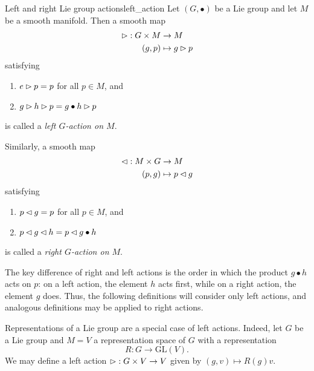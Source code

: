 \begin{definition}{Left and right Lie group actions}{left_action}
    Let \((G, \bullet)\) be a Lie group and let \(M\) be a smooth manifold. Then a smooth map
    \begin{align*}
        \mathbin{\vartriangleright} : G \times M &\to M\\
                     (g,p) &\mapsto g \mathbin{\vartriangleright} p
    \end{align*}
    satisfying
    \begin{enumerate}[label=(\alph*)]
        \item \(e \mathbin{\vartriangleright} p = p\) for all \(p \in M\), and
        \item \(g \mathbin{\vartriangleright} h \mathbin{\vartriangleright} p = g \bullet h \mathbin{\vartriangleright} p\)
    \end{enumerate}
    is called a \emph{left \(G\)-action on \(M\)}.

    Similarly, a smooth map
    \begin{align*}
        \mathbin{\vartriangleleft} : M \times G &\to M\\
                     (p,g) &\mapsto p \mathbin{\vartriangleleft} g
    \end{align*}
    satisfying
    \begin{enumerate}[label=(\alph*)]
        \item \(p \mathbin{\vartriangleleft} g = p\) for all \(p \in M\), and
        \item \(p \mathbin{\vartriangleleft} g \mathbin{\vartriangleleft} h = p \mathbin{\vartriangleleft} g \bullet h\)
    \end{enumerate}
    is called a \emph{right \(G\)-action on \(M\)}.
\end{definition}
\begin{remark}
    The key difference of right and left actions is the order in which the product \(g \bullet h\) acts on \(p\): on a left action, the element \(h\) acts first, while on a right action, the element \(g\) does. Thus, the following definitions will consider only left actions, and analogous definitions may be applied to right actions.
\end{remark}
\begin{example}
    Representations of a Lie group are a special case of left actions. Indeed, let \(G\) be a Lie group and \(M = V\) a representation space of \(G\) with a representation
    \begin{equation*}
        R : G \to \mathrm{GL}(V).
    \end{equation*}
    We may define a left action \(\mathbin{\vartriangleright} : G \times V \to V\) given by \((g,v) \mapsto R(g)v\).
\end{example}

